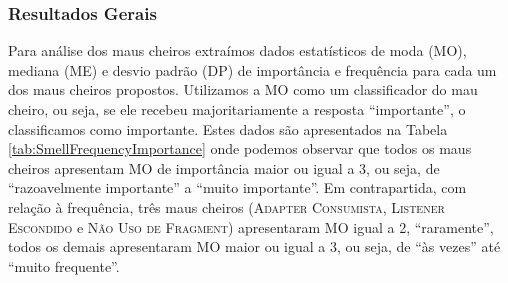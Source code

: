 
\subsubsection{Resultados Gerais}
\label{phase2-general-results} 

Para análise dos maus cheiros extraímos dados estatísticos de moda (MO), mediana (ME) e desvio padrão (DP) de importância e frequência para cada um dos maus cheiros propostos. Utilizamos a MO como um classificador do mau cheiro, ou seja, se ele recebeu majoritariamente a resposta ``importante'', o classificamos como importante. Estes dados são apresentados na Tabela \ref{tab:SmellFrequencyImportance} onde podemos observar que todos os maus cheiros apresentam MO de importância maior ou igual a 3, ou seja, de ``razoavelmente importante'' a ``muito importante''. Em contrapartida, com relação à frequência, três maus cheiros (\textsc{\small Adapter Consumista}, \textsc{\small Listener Escondido} e \textsc{\small Não Uso de Fragment}) apresentaram MO igual a 2, ``raramente'', todos os demais apresentaram MO maior ou igual a 3, ou seja, de ``às vezes'' até ``muito frequente''. 

